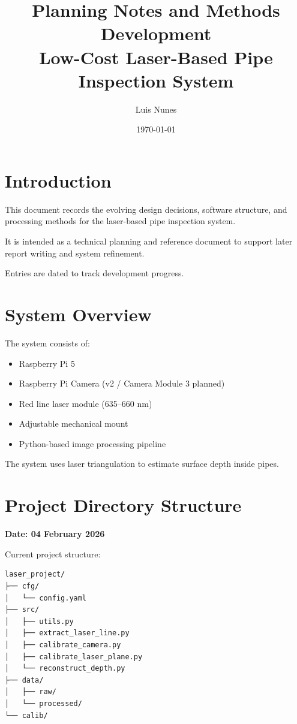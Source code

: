 \documentclass[11pt,a4paper]{article}
\title{Planning Notes and Methods Development\\
Low-Cost Laser-Based Pipe Inspection System}
\author{Luis Nunes}
\date{\today}
\begin{document}
\maketitle

\tableofcontents
\newpage

\section{Introduction}

This document records the evolving design decisions, software structure, and processing methods for the laser-based pipe inspection system.

It is intended as a technical planning and reference document to support later report writing and system refinement.

Entries are dated to track development progress.

\section{System Overview}

The system consists of:

\begin{itemize}
  \item Raspberry Pi 5
  \item Raspberry Pi Camera (v2 / Camera Module 3 planned)
  \item Red line laser module (635--660 nm)
  \item Adjustable mechanical mount
  \item Python-based image processing pipeline
\end{itemize}

The system uses laser triangulation to estimate surface depth inside pipes.

\section{Project Directory Structure}

\textbf{Date: 04 February 2026}

Current project structure:

\begin{lstlisting}
laser_project/
├── cfg/
│   └── config.yaml
├── src/
│   ├── utils.py
│   ├── extract_laser_line.py
│   ├── calibrate_camera.py
│   ├── calibrate_laser_plane.py
│   └── reconstruct_depth.py
├── data/
│   ├── raw/
│   └── processed/
└── calib/
\end{lstlisting}
\end{document}
